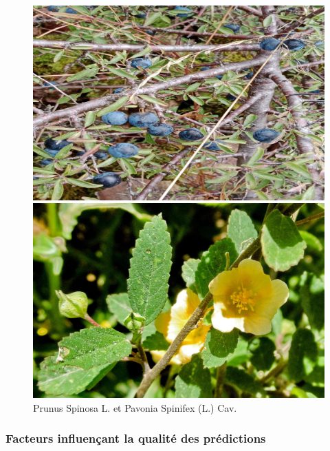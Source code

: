 \documentclass[a4paper,12pt]{article}
\begin{document}
\begin{figure}[H]
\centering
\begin{minipage}{0.5\textwidth}
  \includegraphics[width=0.9\linewidth]{images/prunus_spinosa.jpeg}
\end{minipage}%
\begin{minipage}{0.5\textwidth}
  \includegraphics[width=0.9\linewidth]{images/pavonia_spinifex.jpeg}
\end{minipage}
\caption{Prunus Spinosa L. et Pavonia Spinifex (L.) Cav.}
\end{figure}

\subsubsection{Facteurs influençant la qualité des prédictions}
\end{document}
